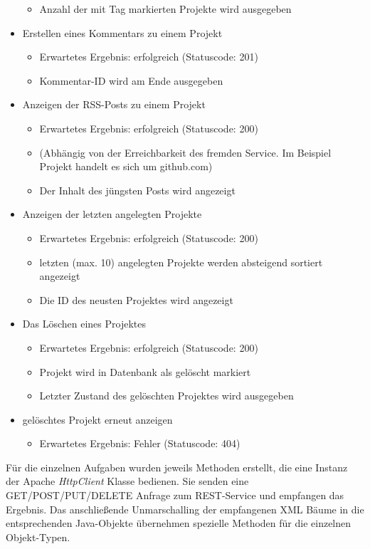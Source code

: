 \documentclass[150]{HSMW-Thesis}
\begin{document}
\begin{itemize}
\begin{itemize}
			\item Anzahl der mit Tag markierten Projekte wird ausgegeben
		\end{itemize}
		\item Erstellen eines Kommentars zu einem Projekt
		\begin{itemize}
			\item Erwartetes Ergebnis: erfolgreich (Statuscode: 201)
			\item Kommentar-ID wird am Ende ausgegeben
		\end{itemize}
		\item Anzeigen der RSS-Posts zu einem Projekt
		\begin{itemize}
			\item Erwartetes Ergebnis: erfolgreich (Statuscode: 200)
			\item (Abhängig von der Erreichbarkeit des fremden Service. Im Beispiel Projekt handelt es sich um github.com)
			\item Der Inhalt des jüngsten Posts wird angezeigt
		\end{itemize}
		\item Anzeigen der letzten angelegten Projekte
		\begin{itemize}
			\item Erwartetes Ergebnis: erfolgreich (Statuscode: 200)
			\item letzten (max. 10) angelegten Projekte werden absteigend sortiert angezeigt
			\item Die ID des neusten Projektes wird angezeigt
		\end{itemize}
		\item Das Löschen eines Projektes
		\begin{itemize}
			\item Erwartetes Ergebnis: erfolgreich (Statuscode: 200)
			\item Projekt wird in Datenbank als gelöscht markiert
			\item Letzter Zustand des gelöschten Projektes wird ausgegeben
		\end{itemize}
		\item gelöschtes Projekt erneut anzeigen
		\begin{itemize}
			\item Erwartetes Ergebnis: Fehler (Statuscode: 404)
		\end{itemize}
		
	\end{itemize}
	
	Für die einzelnen Aufgaben wurden jeweils Methoden erstellt, die eine Instanz der Apache \emph{HttpClient} Klasse bedienen. Sie senden eine GET/POST/PUT/DELETE Anfrage zum REST-Service und empfangen das Ergebnis. Das anschließende Unmarschalling der empfangenen XML Bäume in die entsprechenden Java-Objekte übernehmen spezielle Methoden für die einzelnen Objekt-Typen.
	
\end{document}
